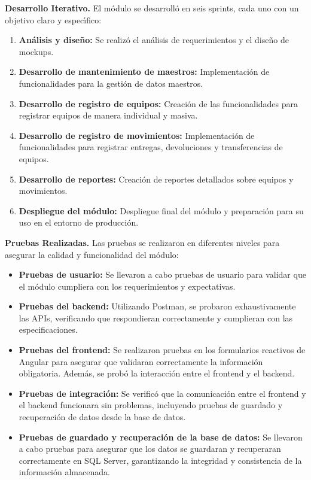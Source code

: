 \documentclass[stu, 12pt, letterpaper, donotrepeattitle, floatsintext, natbib]{apa7}
\begin{document}
\textbf{Desarrollo Iterativo. }El m\'odulo se desarroll\'o en seis sprints, cada uno con un objetivo claro y espec\'{\i}fico:
\begin{enumerate}
    \item\textbf{An\'alisis y dise\~{n}o: }Se realiz\'o el an\'alisis de requerimientos y el dise\~{n}o de mockups.
    \item\textbf{Desarrollo de mantenimiento de maestros: }Implementaci\'on de funcionalidades para la gesti\'on de datos maestros.
    \item\textbf{Desarrollo de registro de equipos: }Creaci\'on de las funcionalidades para registrar equipos de manera individual y masiva.
    \item\textbf{Desarrollo de registro de movimientos: }Implementaci\'on de funcionalidades para registrar entregas, devoluciones y transferencias de equipos.
    \item\textbf{Desarrollo de reportes: }Creaci\'on de reportes detallados sobre equipos y movimientos.
    \item\textbf{Despliegue del m\'odulo: }Despliegue final del m\'odulo y preparaci\'on para su uso en el entorno de producci\'on.
\end{enumerate}

\textbf{Pruebas Realizadas. }Las pruebas se realizaron en diferentes niveles para asegurar la calidad y funcionalidad del m\'odulo:
\begin{itemize}
    \item\textbf{Pruebas de usuario: }Se llevaron a cabo pruebas de usuario para validar que el m\'odulo cumpliera con los requerimientos y expectativas.
    \item\textbf{Pruebas del backend: }Utilizando Postman, se probaron exhaustivamente las APIs, verificando que respondieran correctamente y cumplieran con las especificaciones.
    \item\textbf{Pruebas del frontend: }Se realizaron pruebas en los formularios reactivos de Angular para asegurar que validaran correctamente la informaci\'on obligatoria. Adem\'as, se prob\'o la interacci\'on entre el frontend y el backend.
    \item\textbf{Pruebas de integraci\'on: }Se verific\'o que la comunicaci\'on entre el frontend y el backend funcionara sin problemas, incluyendo pruebas de guardado y recuperaci\'on de datos desde la base de datos.
    \item\textbf{Pruebas de guardado y recuperaci\'on de la base de datos: }Se llevaron a cabo pruebas para asegurar que los datos se guardaran y recuperaran correctamente en SQL Server, garantizando la integridad y consistencia de la informaci\'on almacenada.
\end{itemize}
\end{document}
